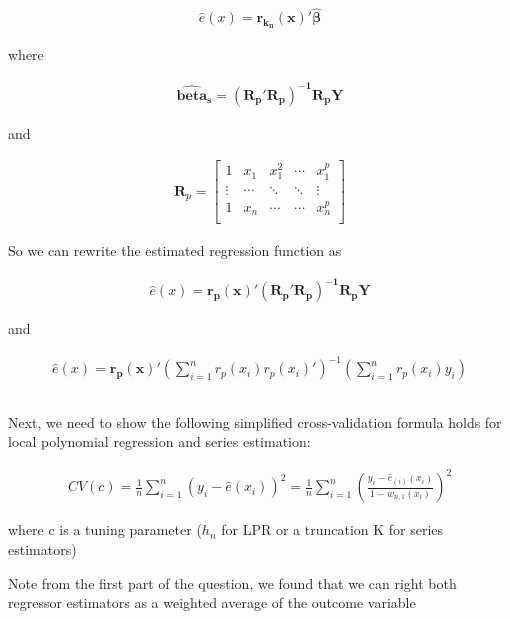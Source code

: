 \documentclass[12pt]{article}
\begin{document}
\begin{gather*}
\hat{e}(x) = \mathbf{r_{k_n}(x)'\hat{\beta}}
\end{gather*}

where

\begin{gather*}
\mathbf{\hat{beta}_s} = \mathbf{\left( R_p'R_p \right)^{-1}R_pY}
\end{gather*}

and

\begin{gather*}
\mathbf{R}_p = \begin{bmatrix}
1 & x_1 & x_1^2 & \cdots & x_1^p \\
\vdots & \cdots & \ddots & \ddots & \vdots \\
1 & x_n & \cdots & \cdots & x_n^p \\
\end{bmatrix}
\end{gather*}

So we can rewrite the estimated regression function as

\begin{gather*}
\hat{e}(x) = \mathbf{r_p(x)'\left( R_p'R_p \right)^{-1}R_pY}
\end{gather*}

and

\begin{gather*}
\hat{e}(x) = \mathbf{r_p(x)'} \left(\sum\limits_{i=1}^n r_p(x_i)r_p(x_i)'\right)^{-1} \left( \sum\limits_{i=1}^n r_p(x_i)y_i\right)
\end{gather*}


\subsection{}

Next, we need to show the following simplified cross-validation formula holds for local polynomial regression and series estimation:

\begin{gather*}
CV(c) = \frac{1}{n} \sum\limits_{i=1}^n (y_i - \hat{e}(x_i))^2  =  \frac{1}{n} \sum\limits_{i=1}^n \left( \frac{y_i - \hat{e}_{(i)}(x_i)} {1-w_{n,1}(x_i)} \right)^2
\end{gather*}

where c is a tuning parameter ($h_n$ for LPR or a truncation K for series estimators)

Note from the first part of the question, we found that we can right both regressor estimators as a weighted average of the outcome variable
\end{document}
